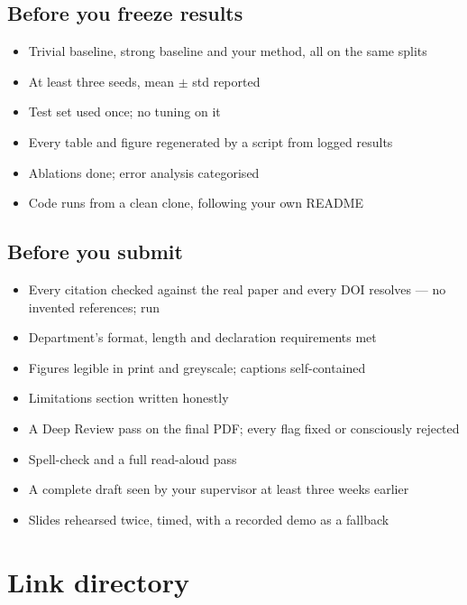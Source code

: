 \documentclass[11pt,a4paper]{article}
\begin{document}
\subsection*{Before you freeze results}
\begin{itemize}
  \item Trivial baseline, strong baseline and your method, all on the same
        splits
  \item At least three seeds, mean $\pm$ std reported
  \item Test set used once; no tuning on it
  \item Every table and figure regenerated by a script from logged results
  \item Ablations done; error analysis categorised
  \item Code runs from a clean clone, following your own README
\end{itemize}

\subsection*{Before you submit}
\begin{itemize}
  \item Every citation checked against the real paper and every DOI
        resolves --- no invented references;  run
  \item Department's format, length and declaration requirements met
  \item Figures legible in print and greyscale; captions self-contained
  \item Limitations section written honestly
  \item A Deep Review pass on the final PDF; every flag fixed or consciously
        rejected
  \item Spell-check and a full read-aloud pass
  \item A complete draft seen by your supervisor at least three weeks earlier
  \item Slides rehearsed twice, timed, with a recorded demo as a fallback
\end{itemize}

\appendix
\section{Link directory}
\end{document}
